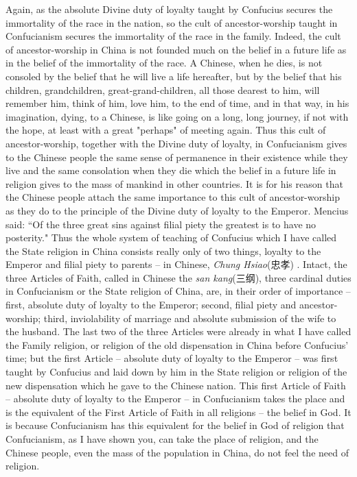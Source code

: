 Again, as the absolute Divine duty of loyalty taught by Confucius secures the immortality of the race in the nation,
so the cult of ancestor-worship taught in Confucianism secures the immortality of the race in the family.
Indeed, the cult of ancestor-worship in China is not founded much on the belief in a future life as in the belief of the immortality of the race.
A Chinese, when he dies, is not consoled by the belief that he will live a life hereafter,
but by the belief that his children, grandchildren, great-grand-children, all those dearest to him,
will remember him, think of him, love him, to the end of time,
and in that way, in his imagination, dying, to a Chinese, is like going on a long, long journey,
if not with the hope, at least with a great "perhaps" of meeting again.
Thus this cult of ancestor-worship, together with the Divine duty of loyalty,
in Confucianism gives to the Chinese people the same sense of permanence in their existence while they live and the same consolation when they die
which the belief in a future life in religion gives to the mass of mankind in other countries.
It is for his reason that the Chinese people attach the same importance to this cult of ancestor-worship
as they do to the principle of the Divine duty of loyalty to the Emperor.
Mencius said: ``Of the three great sins against filial piety the greatest is to have no posterity."
Thus the whole system of teaching of Confucius which I have called the State religion in China consists really only of two things,
loyalty to the Emperor and filial piety to parents -- in Chinese, \emph{Chung Hsiao}(忠孝) .
Intact, the three Articles of Faith, called in Chinese the \emph{san kang}(三纲), three cardinal duties in Confucianism or the State religion of China, are, in their order of importance --
first, absolute duty of loyalty to the Emperor;
second, filial piety and ancestor-worship;
third, inviolability of marriage and absolute submission of the wife to the husband.
The last two of the three Articles were already in what I have called the Family religion,
or religion of the old dispensation in China before Confucius' time;
but the first Article -- absolute duty of loyalty to the Emperor
-- was first taught by Confucius and laid down by him in the State religion or religion of the new dispensation which he gave to the Chinese nation.
This first Article of Faith -- absolute duty of loyalty to the Emperor
-- in Confucianism takes the place and is the equivalent of the First Article of Faith in all religions
-- the belief in God.
It is because Confucianism has this equivalent for the belief in God of religion
that Confucianism,
as I have shown you, can take the place of religion,
and the Chinese people, even the mass of the population in China,
do not feel the need of religion.

